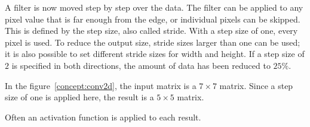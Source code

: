 {	
	A filter is now moved step by step over the data.  The filter can be applied to any pixel value that is far enough from the edge, or individual pixels can be skipped. This is defined by the step size, also called stride. With a step size of one, every pixel is used. To reduce the output size, stride sizes larger than one can be used; it is also possible to set different stride sizes for width and height. If a step size of $2$ is specified in both directions, the amount of data has been reduced to $25\%$. \cite{Dumoulin:2016}
	
	In the figure~\ref{concept:conv2d}, the input matrix is a $7\times 7$ matrix. Since a step size of one is applied here, the result is a $5\times 5$ matrix.
	
	Often an activation function is applied to each result.
	
	\begin{figure}[htb]
		
		
		\centering
\end{figure}}
